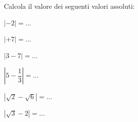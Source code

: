 \subsubsection*{}

\begin{esercizio}\label{ese:03.1}
Calcola il valore dei seguenti valori assoluti:
\begin{multicols}{3}
\begin{enumeratea}
\item \(|-2|=\dots\)
\item \(|+7|=\dots\)
\item \(|3-7|=\dots\)
\item \(|5-\dfrac{1}{3}|=\dots\)
\item \(|\sqrt{2}-\sqrt{6}|=\dots\)
\item \(|\sqrt{3}-2|=\dots\)
\end{enumeratea}
\end{multicols}
\end{esercizio}


